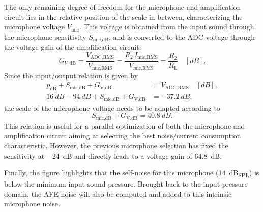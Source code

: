 \documentclass{EPL-master-thesis-covers-EN}
\newcommand{\te}[1]{\textrm{#1}}
\begin{document}
The only remaining degree of freedom for the microphone and amplification circuit lies in the relative position of the scale in between, characterizing the microphone voltage $V_\te{mic}$. This voltage is obtained from the input sound through the microphone sensitivity $S_{\te{mic,dB}}$, and is converted to the ADC voltage through the voltage gain of the amplification circuit:
\[
 G_{V,\te{dB}} = \frac{V_\te{ADC,RMS}}{V_\te{mic,RMS}} = \frac{R_2 \, I_\te{mic,RMS}}{V_\te{mic,RMS}} = \frac{R_2}{R_\te{L}} \quad \si{[dB]}.
\]
Since the input/output relation is given by
\begin{align*}
  p_\te{dB} + S_{\te{mic,dB}} + G_{\te{V,dB}} &= V_\te{ADC,RMS} \quad \si{[dB]},\\
  \SI{16}{dB} - \SI{94}{dB} + S_{\te{mic,dB}} + G_{\te{V,dB}} &= 
  \SI{-37.2}{dB},
\end{align*}
the scale of the microphone voltage needs to be adapted according to
\[
 S_{\te{mic,dB}} + G_{\te{V,dB}} = \SI{40.8}{dB}.
\]
This relation is useful for a parallel optimization of both the microphone and amplification circuit aiming at selecting the best noise/current consumption characteristic. However, the previous microphone selection has fixed the sensitivity at \SI{-24}{dB} and directly leads to a voltage gain of \SI{64.8}{dB}.

Finally, the figure highlights that the self-noise for this microphone (\SI{14}{dB_{SPL}}) is below the minimum input sound pressure. Brought back to the input pressure domain, the AFE noise will also be computed and added to this intrinsic microphone noise.
\end{document}
